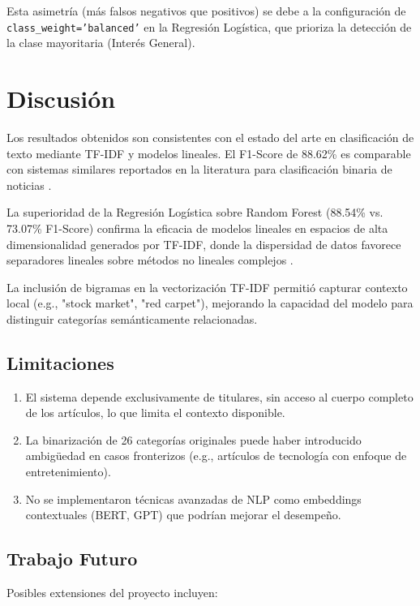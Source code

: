 \documentclass[12pt,a4paper]{article}
\begin{document}
Esta asimetría (más falsos negativos que positivos) se debe a la configuración de \texttt{class\_weight='balanced'} en la Regresión Logística, que prioriza la detección de la clase mayoritaria (Interés General).

\section{Discusión}

Los resultados obtenidos son consistentes con el estado del arte en clasificación de texto mediante TF-IDF y modelos lineales. El F1-Score de 88.62\% es comparable con sistemas similares reportados en la literatura para clasificación binaria de noticias \cite{wu2019}.

La superioridad de la Regresión Logística sobre Random Forest (88.54\% vs. 73.07\% F1-Score) confirma la eficacia de modelos lineales en espacios de alta dimensionalidad generados por TF-IDF, donde la dispersidad de datos favorece separadores lineales sobre métodos no lineales complejos \cite{yang1999}.

La inclusión de bigramas en la vectorización TF-IDF permitió capturar contexto local (e.g., "stock market", "red carpet"), mejorando la capacidad del modelo para distinguir categorías semánticamente relacionadas.

\subsection{Limitaciones}

\begin{enumerate}
    \item El sistema depende exclusivamente de titulares, sin acceso al cuerpo completo de los artículos, lo que limita el contexto disponible.
    \item La binarización de 26 categorías originales puede haber introducido ambigüedad en casos fronterizos (e.g., artículos de tecnología con enfoque de entretenimiento).
    \item No se implementaron técnicas avanzadas de NLP como embeddings contextuales (BERT, GPT) que podrían mejorar el desempeño.
\end{enumerate}

\subsection{Trabajo Futuro}

Posibles extensiones del proyecto incluyen:
\end{document}
